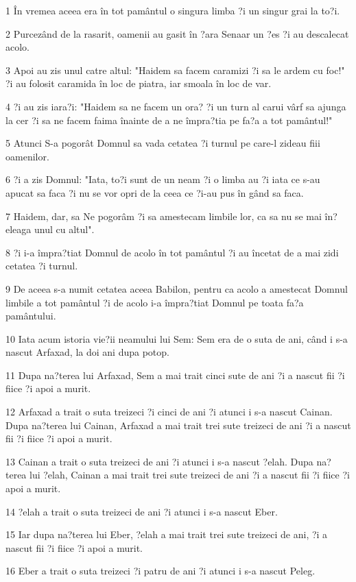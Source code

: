 \par 1 În vremea aceea era în tot pamântul o singura limba ?i un singur grai la to?i.
\par 2 Purcezând de la rasarit, oamenii au gasit în ?ara Senaar un ?es ?i au descalecat acolo.
\par 3 Apoi au zis unul catre altul: "Haidem sa facem caramizi ?i sa le ardem cu foc!" ?i au folosit caramida în loc de piatra, iar smoala în loc de var.
\par 4 ?i au zis iara?i: "Haidem sa ne facem un ora? ?i un turn al carui vârf sa ajunga la cer ?i sa ne facem faima înainte de a ne împra?tia pe fa?a a tot pamântul!"
\par 5 Atunci S-a pogorât Domnul sa vada cetatea ?i turnul pe care-l zideau fiii oamenilor.
\par 6 ?i a zis Domnul: "Iata, to?i sunt de un neam ?i o limba au ?i iata ce s-au apucat sa faca ?i nu se vor opri de la ceea ce ?i-au pus în gând sa faca.
\par 7 Haidem, dar, sa Ne pogorâm ?i sa amestecam limbile lor, ca sa nu se mai în?eleaga unul cu altul".
\par 8 ?i i-a împra?tiat Domnul de acolo în tot pamântul ?i au încetat de a mai zidi cetatea ?i turnul.
\par 9 De aceea s-a numit cetatea aceea Babilon, pentru ca acolo a amestecat Domnul limbile a tot pamântul ?i de acolo i-a împra?tiat Domnul pe toata fa?a pamântului.
\par 10 Iata acum istoria vie?ii neamului lui Sem: Sem era de o suta de ani, când i s-a nascut Arfaxad, la doi ani dupa potop.
\par 11 Dupa na?terea lui Arfaxad, Sem a mai trait cinci sute de ani ?i a nascut fii ?i fiice ?i apoi a murit.
\par 12 Arfaxad a trait o suta treizeci ?i cinci de ani ?i atunci i s-a nascut Cainan. Dupa na?terea lui Cainan, Arfaxad a mai trait trei sute treizeci de ani ?i a nascut fii ?i fiice ?i apoi a murit.
\par 13 Cainan a trait o suta treizeci de ani ?i atunci i s-a nascut ?elah. Dupa na?terea lui ?elah, Cainan a mai trait trei sute treizeci de ani ?i a nascut fii ?i fiice ?i apoi a murit.
\par 14 ?elah a trait o suta treizeci de ani ?i atunci i s-a nascut Eber.
\par 15 Iar dupa na?terea lui Eber, ?elah a mai trait trei sute treizeci de ani, ?i a nascut fii ?i fiice ?i apoi a murit.
\par 16 Eber a trait o suta treizeci ?i patru de ani ?i atunci i s-a nascut Peleg.
